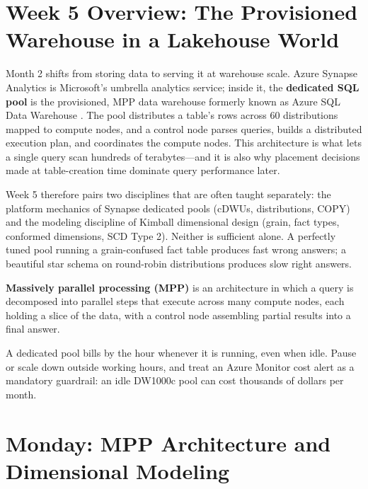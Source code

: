 \section{Week 5 Overview: The Provisioned Warehouse in a Lakehouse World}
Month 2 shifts from storing data to serving it at warehouse scale. Azure Synapse Analytics is Microsoft's umbrella analytics service; inside it, the \textbf{dedicated SQL pool} is the provisioned, MPP data warehouse formerly known as Azure SQL Data Warehouse \cite{microsoft2025synapse}. The pool distributes a table's rows across 60 distributions mapped to compute nodes, and a control node parses queries, builds a distributed execution plan, and coordinates the compute nodes. This architecture is what lets a single query scan hundreds of terabytes---and it is also why placement decisions made at table-creation time dominate query performance later.

Week 5 therefore pairs two disciplines that are often taught separately: the platform mechanics of Synapse dedicated pools (cDWUs, distributions, COPY) and the modeling discipline of Kimball dimensional design (grain, fact types, conformed dimensions, SCD Type 2). Neither is sufficient alone. A perfectly tuned pool running a grain-confused fact table produces fast wrong answers; a beautiful star schema on round-robin distributions produces slow right answers.

\begin{definitionbox}
\textbf{Massively parallel processing (MPP)} is an architecture in which a query is decomposed into parallel steps that execute across many compute nodes, each holding a slice of the data, with a control node assembling partial results into a final answer.
\end{definitionbox}

\begin{notebox}
A dedicated pool bills by the hour whenever it is running, even when idle. Pause or scale down outside working hours, and treat an Azure Monitor cost alert as a mandatory guardrail: an idle DW1000c pool can cost thousands of dollars per month.
\end{notebox}

\section{Monday: MPP Architecture and Dimensional Modeling}

